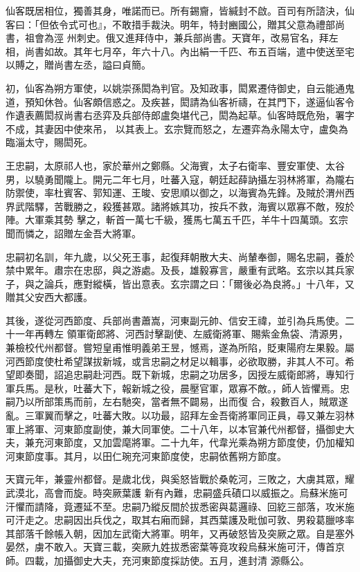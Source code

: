 \begin{pinyinscope}
 仙客既居相位，獨善其身，唯諾而已。所有錫齎，皆緘封不啟。百司有所諮決，仙客曰：「但依令式可也』，不敢措手裁決。明年，特封豳國公，贈其父意為禮部尚書，祖會為涇
 州刺史。俄又進拜侍中，兼兵部尚書。天寶年，改易官名，拜左相，尚書如故。其年七月卒，年六十八。內出絹一千匹、布五百端，遣中使送至宅以賻之，贈尚書左丞，謚曰貞簡。



 初，仙客為朔方軍使，以姚崇孫閎為判官。及知政事，閎累遷侍御史，自云能通鬼道，預知休咎。仙客頗信惑之。及疾甚，閎請為仙客祈禱，在其門下，遂逼仙客令作遺表薦閎叔尚書右丞弈及兵部侍郎盧奐堪代己，閎為起草。仙客時既危殆，署字不成，其妻因中使來吊，
 以其表上。玄宗覽而怒之，左遷弈為永陽太守，盧奐為臨淄太守，賜閎死。



 王忠嗣，太原祁人也，家於華州之鄭縣。父海賓，太子右衛率、豐安軍使、太谷男，以驍勇聞隴上。開元二年七月，吐蕃入寇，朝廷起薛訥攝左羽林將軍，為隴右防禦使，率杜賓客、郭知運、王晙、安思順以御之，以海賓為先鋒。及賊於渭州西界武階驛，苦戰勝之，殺獲甚眾。諸將嫉其功，按兵不救，海賓以眾寡不敵，歿於陣。大軍乘其勢
 擊之，斬首一萬七千級，獲馬七萬五千匹，羊牛十四萬頭。玄宗聞而憐之，詔贈左金吾大將軍。



 忠嗣初名訓，年九歲，以父死王事，起復拜朝散大夫、尚輦奉御，賜名忠嗣，養於禁中累年。肅宗在忠邸，與之游處。及長，雄毅寡言，嚴重有武略。玄宗以其兵家子，與之論兵，應對縱橫，皆出意表。玄宗謂之曰：「爾後必為良將。」十八年，又贈其父安西大都護。



 其後，遂從河西節度、兵部尚書蕭嵩，河東副元帥、信安王禕，並引為兵馬使。二十一年再轉左
 領軍衛郎將、河西討擊副使、左威衛將軍、賜紫金魚袋、清源男，兼檢校代州都督。嘗短皇甫惟明義弟王昱，憾焉，遂為所陷，貶東陽府左果毅。屬河西節度使杜希望謀拔新城，或言忠嗣之材足以輯事，必欲取勝，非其人不可。希望即奏聞，詔追忠嗣赴河西。既下新城，忠嗣之功居多，因授左威衛郎將，專知行軍兵馬。是秋，吐蕃大下，報新城之役，晨壓官軍，眾寡不敵。，師人皆懼焉。忠嗣乃以所部策馬而前，左右馳突，當者無不闢易，出而復
 合，殺數百人，賊眾遂亂。三軍翼而擊之，吐蕃大敗。以功最，詔拜左金吾衛將軍同正員，尋又兼左羽林軍上將軍、河東節度副使，兼大同軍使。二十八年，以本官兼代州都督，攝御史大夫，兼充河東節度，又加雲麾將軍。二十九年，代韋光乘為朔方節度使，仍加權知河東節度事。其月，以田仁琬充河東節度使，忠嗣依舊朔方節度。



 天寶元年，兼靈州都督。是歲北伐，與奚怒皆戰於桑乾河，三敗之，大虜其眾，耀武漠北，高會而旋。時突厥葉護
 新有內難，忠嗣盛兵磧口以威振之。烏蘇米施可汗懼而請降，竟遷延不至。忠嗣乃縱反間於拔悉密與葛邏祿、回紇三部落，攻米施可汗走之。忠嗣因出兵伐之，取其右廂而歸，其西葉護及毗伽可敦、男殺葛臘哆率其部落千餘帳入朝，因加左武衛大將軍。明年，又再破怒皆及突厥之眾。自是塞外晏然，虜不敢入。天寶三載，突厥九姓拔悉密葉等竟攻殺烏蘇米施可汗，傳首京師。四載，加攝御史大夫，充河東節度採訪使。五月，進封清
 源縣公。




\end{pinyinscope}
